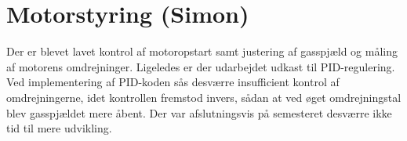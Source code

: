 \section{Motorstyring (Simon)}
\label{sec:motorstyring-2} 

Der er blevet lavet kontrol af motoropstart samt justering af gasspjæld og måling af motorens omdrejninger. Ligeledes er der udarbejdet udkast til PID-regulering. Ved implementering af PID-koden sås desværre insufficient kontrol af omdrejningerne, idet kontrollen fremstod invers, sådan at ved øget omdrejningstal blev gasspjældet mere åbent. Der var afslutningsvis på semesteret desværre ikke tid til mere udvikling.


% 

\clearpage


% 

% 

% 

% 

% 

% 

% 

% 

% 

